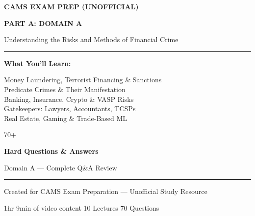 \documentclass[12pt,aspectratio=169]{beamer}
\newcommand{\checkmarkgreen}{\textcolor{udemygreen}{\textbf{\checkmark}}}
\newcommand{\keypoint}[1]{\textcolor{udemyblue}{\textbf{#1}}}
\begin{document}
	
	\begin{frame}
		\centering
		\vspace{0.3cm}
		
		{\fontsize{6}{7}\selectfont \textcolor{udemyblue}{\textbf{CAMS EXAM PREP (UNOFFICIAL)}}}
		
		\vspace{0.1cm}
		{\fontsize{14}{17}\selectfont \textbf{PART A: DOMAIN A}}
		
		\vspace{0.05cm}
		{\fontsize{9}{11}\selectfont \textcolor{udemygray}{Understanding the Risks and Methods of Financial Crime}}
		
		\vspace{0.2cm}
		\rule{9cm}{0.5pt}
		
		\vspace{0.15cm}
		
		\begin{minipage}{0.48\textwidth}
			\centering
			
			{\fontsize{8}{10}\selectfont \keypoint{What You'll Learn:}}
			\vspace{0.05cm}
			
			\begin{minipage}{0.95\textwidth}
				{\fontsize{6}{7}\selectfont
					\checkmarkgreen Money Laundering, Terrorist Financing \& Sanctions \\
					\checkmarkgreen Predicate Crimes \& Their Manifestation \\
					\checkmarkgreen Banking, Insurance, Crypto \& VASP Risks \\
					\checkmarkgreen Gatekeepers: Lawyers, Accountants, TCSPs \\
					\checkmarkgreen Real Estate, Gaming \& Trade-Based ML
				}
			\end{minipage}
		\end{minipage}
		\hfill
		\begin{minipage}{0.48\textwidth}
			\centering
			\vspace{0.2cm}
			{\fontsize{30}{35}\selectfont \textcolor{udemyblue}{70+}}
			\vspace{0.05cm}
			
			{\fontsize{8}{10}\selectfont \textbf{Hard Questions \& Answers}}
			\vspace{0.1cm}
			
			{\fontsize{6}{7}\selectfont \textcolor{udemygray}{Domain A — Complete Q\&A Review}}
		\end{minipage}
		
		\vspace{0.15cm}
		\rule{9cm}{0.5pt}
		
		\vspace{0.1cm}
		{\fontsize{5}{6}\selectfont \textcolor{udemygray}{Created for CAMS Exam Preparation — Unofficial Study Resource}}
		
		\vspace{0.1cm}
		{\fontsize{4}{5}\selectfont \textcolor{udemygray}{1hr 9min of video content  10 Lectures  70 Questions}}
	\end{frame}
	
\end{document}
